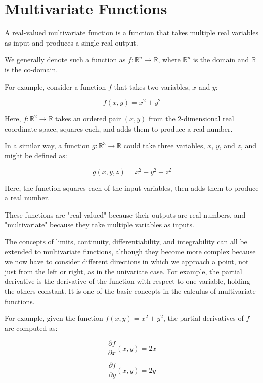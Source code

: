 \chapter{Multivariate Functions}

A real-valued multivariate function is a function that takes multiple
real variables as input and produces a single real output.

We generally denote such a function as $f: \mathbb{R}^n \rightarrow
\mathbb{R}$, where $\mathbb{R}^n$ is the domain and $\mathbb{R}$ is
the co-domain.

For example, consider a function $f$ that takes two variables, $x$ and
$y$:

\begin{equation*}
f(x, y) = x^2 + y^2
\end{equation*}

Here, $f: \mathbb{R}^2 \rightarrow \mathbb{R}$ takes an ordered pair
$(x, y)$ from the 2-dimensional real coordinate space, squares each,
and adds them to produce a real number.

In a similar way, a function $g: \mathbb{R}^3 \rightarrow \mathbb{R}$
could take three variables, $x$, $y$, and $z$, and might be defined as:

\begin{equation*}
g(x, y,z) = x^2 + y^2 + z^2
\end{equation*}

Here, the function squares each of the input variables, then adds
them to produce a real number.

These functions are "real-valued" because their outputs are real
numbers, and "multivariate" because they take multiple variables as
inputs.

The concepts of limits, continuity, differentiability, and
integrability can all be extended to multivariate functions, although
they become more complex because we now have to consider different
directions in which we approach a point, not just from the left or
right, as in the univariate case. For example, the partial derivative
is the derivative of the function with respect to one variable,
holding the others constant. It is one of the basic concepts in the
calculus of multivariate functions.

For example, given the function $f(x, y) = x^2 + y^2$, the partial
derivatives of $f$ are computed as:

\begin{equation*}
\frac{\partial f}{\partial x}(x, y) = 2x
\end{equation*}

\begin{equation*}
\frac{\partial f}{\partial y}(x, y) = 2y
\end{equation*}

